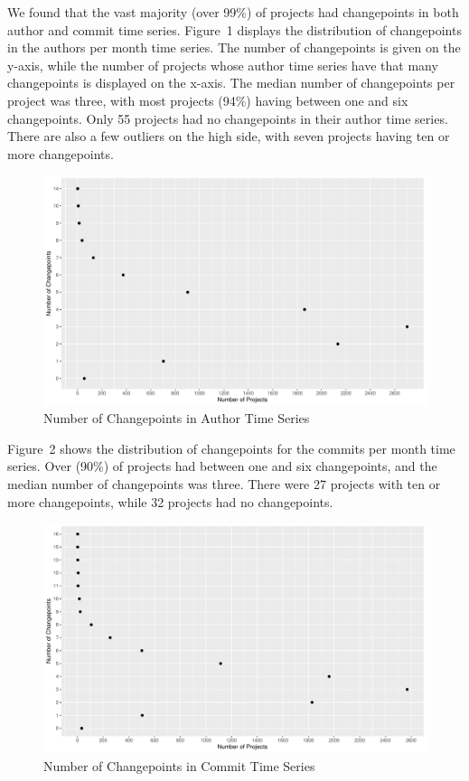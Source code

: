\documentclass[10pt,conference]{IEEEtran}
\begin{document}
We found that the vast majority (over 99\%) of projects had changepoints in both author and commit time series. Figure~1 displays the distribution of changepoints in the authors per month time series. The number of changepoints is given on the y-axis, while the number of projects whose author time series have that many changepoints is displayed on the x-axis. The median number of changepoints per project was three, with most projects (94\%) having between one and six changepoints. Only 55 projects had no changepoints in their author time series. There are also a few outliers on the high side, with seven projects having ten or more changepoints.
\begin{figure}[ht!]
    \centering
    \includegraphics[width=\linewidth]{author-changepoints.pdf}
    \caption{Number of Changepoints in Author Time Series}
    \label{fig:authorcpts}
\end{figure}

Figure~2 shows the distribution of changepoints for the commits per month time series.
Over (90\%) of projects had between one and six changepoints, and the median number of changepoints was three. There were 27 projects with ten or more changepoints, while 32 projects had no changepoints.

\begin{figure}[ht!]
    \centering
    \includegraphics[width=\linewidth]{commit-changepoints.pdf}
    \caption{Number of Changepoints in Commit Time Series}
    \label{fig:commitcpts}
\end{figure}
\end{document}
